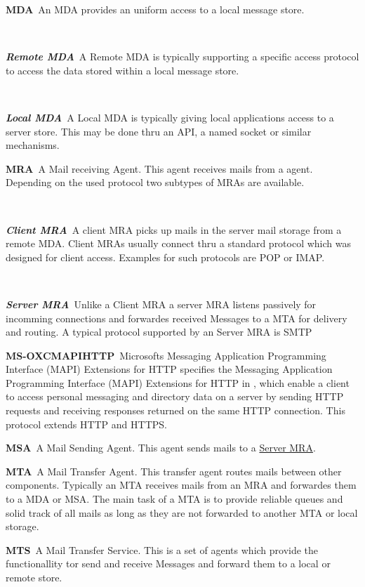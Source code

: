 \documentclass[a4paper,appendixprefix,pdfusetitle,twocolumn,fontsize=8pt,attachdocs,draft,status=draft]{scrbook}
\newenvironment{entry}{\par\leavevmode\hangpara{1.5mm}{1}\ignorespaces}{\RaggedRight\par}
\newcommand*{\mainentry}[2]{{\bfseries{#1\label{def:#1}}}~#2\par}
\newcommand*{\subentry}[2]{\par~\begin{minipage}{\columnwidth-0.6cm}{\bfseries{\itshape{#1\label{def:#1}}}}~#2\end{minipage}}
\newcommand*{\defref}[1]{\hyperref[def:#1]{#1}}
\begin{document}
\begin{entry}
  \mainentry{MDA}{An MDA provides an uniform access to a local message store.}
  \subentry{Remote MDA}{A Remote MDA is typically supporting a specific access protocol to access the data stored within a local message store.}
  \subentry{Local MDA}{A Local MDA is typically giving local applications access to a server store. This may be done thru an API, a named socket or similar mechanisms.}
\end{entry}

\begin{entry}
  \mainentry{MRA}{A Mail receiving Agent. This agent receives mails from a agent. Depending on the used protocol two subtypes of MRAs are available.}
  \subentry{Client MRA}{A client MRA picks up mails in the server mail storage from a remote MDA. Client MRAs usually connect thru a standard protocol which was designed for client access. Examples for such protocols are POP or IMAP.}
  \subentry{Server MRA}{Unlike a Client MRA a server MRA listens passively for incomming connections and forwardes received Messages to a MTA for delivery and routing. A typical protocol supported by an Server MRA is SMTP}
\end{entry}

\begin{entry}
  \mainentry{MS-OXCMAPIHTTP}{Microsofts Messaging Application Programming Interface (MAPI) 
  	Extensions for HTTP specifies the Messaging Application Programming Interface (MAPI) Extensions for HTTP in \cite{ms-oxcmapihttp}, which enable a client to access personal messaging and directory data on a server by sending HTTP requests and receiving responses returned on the same HTTP connection. This protocol extends HTTP and HTTPS.}
\end{entry}

\begin{entry}
  \mainentry{MSA}{A Mail Sending Agent. This agent sends mails to a \defref{Server MRA}. }
\end{entry}

\begin{entry}
  \mainentry{MTA}{A Mail Transfer Agent. This transfer agent routes mails between other components. Typically  an MTA receives mails from an MRA and forwardes them to a MDA or MSA. The main task of a MTA is to provide reliable queues and solid track of all mails as long as they are not forwarded to another MTA or local storage.}
\end{entry}

\begin{entry}
  \mainentry{MTS}{A Mail Transfer Service. This is a set of agents which provide the functionallity tor send and receive Messages and forward them to a local or remote store.}
\end{entry}
\end{document}

